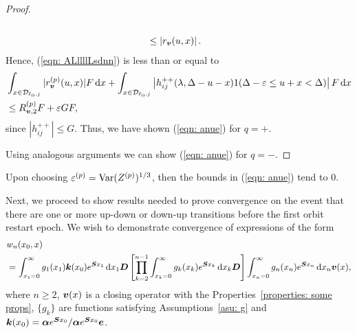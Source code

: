 \begin{proof}
\begin{align}
					\\&\leq \left| r_{\boldsymbol v}(u,x) \right|.
				\end{align}
				Hence, (\ref{eqn: ALllllLsdnn}) is less than or equal to 
                \begin{align}
                	& \int_{x\in\mathcal{D}_{\ell_0,j}} |r_{\boldsymbol v}^{(p)}(u,x)| F \, \mathrm{d} x
                	+ \int_{x\in\mathcal{D}_{\ell_0,j}} \left| h_{ij}^{++}(\lambda,\Delta-u-x) 1(\Delta-\varepsilon \leq u+x < \Delta) \right| F \, \mathrm{d} x\nonumber 
                	\\&\leq R^{(p)}_{{\boldsymbol v},2} F + \varepsilon GF, \nonumber 
                \end{align}
				since \(|h_{ij}^{++}|\leq G\). Thus, we have shown (\ref{eqn: anue}) for \(q=+\). 

                Using analogous arguments we can show  (\ref{eqn: anue}) for \(q=-\).
\end{proof}
Upon choosing \(\varepsilon^{(p)}=\mathrm{Var}(Z^{(p)})^{1/3}\), then the bounds in (\ref{eqn: anue}) tend to 0. 

Next, we proceed to show results needed to prove convergence on the event that there are one or more up-down or down-up transitions before the first orbit restart epoch. We wish to demonstrate convergence of expressions of the form
\begin{align}
	&w_n(x_0,x) \nonumber
	\\&=\int_{x_1=0}^\infty g_1(x_1) \boldsymbol k(x_0) e^{\boldsymbol{S}x_1}\, \mathrm{d} x_1\boldsymbol D 
			\left[\prod_{k=2}^{n-1}\int_{x_k=0}^\infty g_k(x_k) e^{\boldsymbol{S}x_k} \, \mathrm{d} x_k \boldsymbol D\right] \int_{x_n=0}^\infty g_{n}(x_n) e^{\boldsymbol{S}x_n} \, \mathrm{d} x_n {\boldsymbol v}(x), \label{eqn: salkdjgaf} 
\end{align}
where \(n\geq 2\), \(\boldsymbol v(x)\) is a closing operator with the Properties~\ref{properties: some props}, \(\{g_k\}\) are functions satisfying Assumptions~\ref{asu: g} and \(\boldsymbol k(x_0)=\boldsymbol\alpha e^{\boldsymbol Sx_0}/\boldsymbol\alpha e^{\boldsymbol Sx_0}\boldsymbol e\). 

